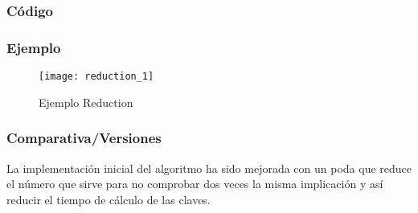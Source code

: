 \subsubsection{C\'odigo} 

\newpage
\subsubsection{Ejemplo} 
\begin{figure}[H]
    \centering
    \texttt{[image: reduction\_1]}
    \caption{Ejemplo Reduction}
    \label{fig:reduction_1}
\end{figure}
\subsubsection{Comparativa/Versiones} 
La implementaci\'on inicial del algoritmo ha sido mejorada con un poda que reduce el n\'umero que sirve para no comprobar dos veces la misma implicaci\'on y as\'i reducir el tiempo de c\'alculo de las claves.
